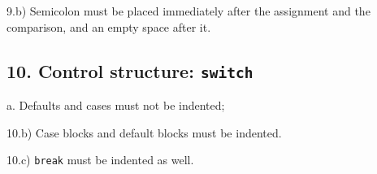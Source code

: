 \documentclass[12pt,openright,a4paper,conference,onecolumn,twoside,english,french,spanish]{IEEEtran}
\begin{document}
9.b) Semicolon must be placed immediately after the assignment and the
comparison, and an empty space after it.

\begin{Shaded}
\begin{Highlighting}[]
 \NormalTok{(} 
   \NormalTok{(} 
    \CommentTok{// ---}
     
        \NormalTok{) + }\NormalTok{),}
        \NormalTok{) + }\NormalTok{)}
    \NormalTok{\}}
    \CommentTok{// ---}
  \NormalTok{\}}
\NormalTok{\}}
\end{Highlighting}
\end{Shaded}

\subsection{10. Control structure:
\texttt{switch}}\label{control-structure-switch}

a. Defaults and cases must not be indented;

10.b) Case blocks and default blocks must be indented.

10.c) \texttt{break} must be indented as well.
\end{document}
